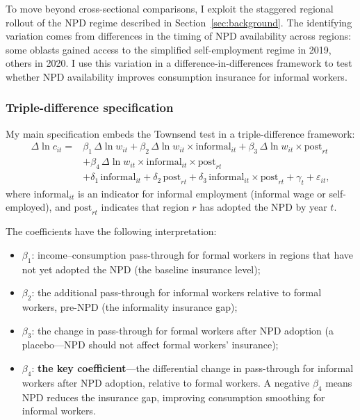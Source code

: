 \documentclass[12pt]{article}
\begin{document}
To move beyond cross-sectional comparisons, I exploit the staggered regional rollout of the NPD regime described in Section~\ref{sec:background}. The identifying variation comes from differences in the timing of NPD availability across regions: some oblasts gained access to the simplified self-employment regime in 2019, others in 2020. I use this variation in a difference-in-differences framework to test whether NPD availability improves consumption insurance for informal workers.

\subsubsection{Triple-difference specification}

My main specification embeds the Townsend test in a triple-difference framework:
\begin{align}\label{eq:did}
\Delta \ln c_{it} = {} & \beta_1 \, \Delta \ln w_{it} + \beta_2 \, \Delta \ln w_{it} \times \text{informal}_{it} + \beta_3 \, \Delta \ln w_{it} \times \text{post}_{rt} \nonumber \\
& + \beta_4 \, \Delta \ln w_{it} \times \text{informal}_{it} \times \text{post}_{rt} \nonumber \\
& + \delta_1 \, \text{informal}_{it} + \delta_2 \, \text{post}_{rt} + \delta_3 \, \text{informal}_{it} \times \text{post}_{rt} + \gamma_t + \varepsilon_{it},
\end{align}
where $\text{informal}_{it}$ is an indicator for informal employment (informal wage or self-employed), and $\text{post}_{rt}$ indicates that region $r$ has adopted the NPD by year $t$.

The coefficients have the following interpretation:
\begin{itemize}
\item $\beta_1$: income--consumption pass-through for formal workers in regions that have not yet adopted the NPD (the baseline insurance level);
\item $\beta_2$: the additional pass-through for informal workers relative to formal workers, pre-NPD (the informality insurance gap);
\item $\beta_3$: the change in pass-through for formal workers after NPD adoption (a placebo---NPD should not affect formal workers' insurance);
\item $\beta_4$: \textbf{the key coefficient}---the differential change in pass-through for informal workers after NPD adoption, relative to formal workers. A negative $\beta_4$ means NPD reduces the insurance gap, improving consumption smoothing for informal workers.
\end{itemize}
\end{document}

